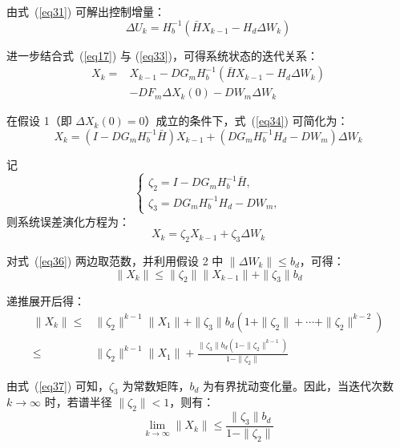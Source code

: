 由式~(\ref{eq31}) 可解出控制增量：
\begin{equation}
\Delta U_k = H_b^{-1}\left( \bar{H} X_{k-1} - H_d \Delta W_k \right)
\label{eq33}
\end{equation}

进一步结合式~(\ref{eq17}) 与 (\ref{eq33})，可得系统状态的迭代关系：
\begin{equation}
\begin{aligned}
X_k = & X_{k-1} - D G_m H_b^{-1}\left( \bar{H} X_{k-1} - H_d \Delta W_k \right) \\
& - D F_m \Delta X_k(0) - D W_m \Delta W_k
\end{aligned}
\label{eq34}
\end{equation}

在假设 1（即 $\Delta X_k(0) = 0$）成立的条件下，式~(\ref{eq34}) 可简化为：
\begin{equation}
X_k = \left( I - D G_m H_b^{-1} \bar{H} \right) X_{k-1} + \left( D G_m H_b^{-1} H_d - D W_m \right) \Delta W_k
\end{equation}

记
\begin{equation}
\left\{
\begin{array}{l}
\zeta_2 = I - D G_m H_b^{-1} \bar{H}, \\
\zeta_3 = D G_m H_b^{-1} H_d - D W_m,
\end{array}
\right.
\label{eq37}
\end{equation}
则系统误差演化方程为：
\begin{equation}
X_k = \zeta_2 X_{k-1} + \zeta_3 \Delta W_k
\label{eq36}
\end{equation}

对式~(\ref{eq36}) 两边取范数，并利用假设 2 中 $\|\Delta W_k\| \leq b_d$，可得：
\begin{equation}
\|X_k\| \leq \|\zeta_2\| \|X_{k-1}\| + \|\zeta_3\| b_d
\label{eq38}
\end{equation}

递推展开后得：
\begin{equation}
\begin{aligned}
\|X_k\| \leq & \|\zeta_2\|^{k-1} \|X_1\| + \|\zeta_3\| b_d \left( 1 + \|\zeta_2\| + \cdots + \|\zeta_2\|^{k-2} \right) \\
\leq & \|\zeta_2\|^{k-1} \|X_1\| + \frac{\|\zeta_3\| b_d \left(1 - \|\zeta_2\|^{k-1}\right)}{1 - \|\zeta_2\|}
\end{aligned}
\label{eq39}
\end{equation}

由式~(\ref{eq37}) 可知，$\zeta_3$ 为常数矩阵，$b_d$ 为有界扰动变化量。因此，当迭代次数 $k \to \infty$ 时，若谱半径 $\|\zeta_2\| < 1$，则有：
\begin{equation}
\lim_{k \to \infty} \|X_k\| \leq \frac{\|\zeta_3\| b_d}{1 - \|\zeta_2\|}
\end{equation}

